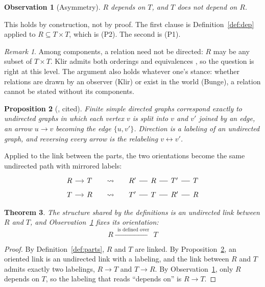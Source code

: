 \documentclass[10pt]{article}
\newtheorem{theorem}{Theorem}
\newtheorem{proposition}[theorem]{Proposition}
\newtheorem{observation}[theorem]{Observation}
\theoremstyle{definition}
\theoremstyle{remark}
\newtheorem*{remark}{Remark}
\begin{document}
\begin{observation}[Asymmetry]\label{lem:asym}
$R$ depends on $T$, and $T$ does not depend on $R$.
\end{observation}
This holds by construction, not by proof. The first clause is Definition~\ref{def:dep} applied to $R \subseteq T \times T$, which is (P2). The second is (P1).

\begin{remark}
Among components, a relation need not be directed: $R$ may be any subset of $T \times T$. Klir admits both orderings and equivalences \cite[p.~5]{klir}, so the question is right at this level. The argument also holds whatever one's stance: whether relations are drawn by an observer (Klir) or exist in the world (Bunge), a relation cannot be stated without its components.
\end{remark}

\begin{proposition}[{\cite[Thm.~4]{pg}}, cited]\label{prop:pg}
Finite simple directed graphs correspond exactly to undirected graphs in which each vertex $v$ is split into $v$ and $v'$ joined by an edge, an arrow $u \to v$ becoming the edge $\{u, v'\}$. Direction is a labeling of an undirected graph, and reversing every arrow is the relabeling $v \leftrightarrow v'$.
\end{proposition}

Applied to the link between the parts, the two orientations become the same undirected path with mirrored labels:
\[
\begin{tikzcd}[column sep=small, row sep=tiny]
  R \arrow[r] & T & \rightsquigarrow & R' \arrow[r, dash] & R \arrow[r, dash] & T' \arrow[r, dash] & T \\
  T \arrow[r] & R & \rightsquigarrow & T' \arrow[r, dash] & T \arrow[r, dash] & R' \arrow[r, dash] & R
\end{tikzcd}
\]

\begin{theorem}\label{thm:main}
The structure shared by the definitions is an undirected link between $R$ and $T$, and Observation~\ref{lem:asym} fixes its orientation:
\[
  R \xrightarrow{\ \ \text{is defined over}\ \ } T
\]
\end{theorem}
\begin{proof}
By Definition~\ref{def:parts}, $R$ and $T$ are linked. By Proposition~\ref{prop:pg}, an oriented link is an undirected link with a labeling, and the link between $R$ and $T$ admits exactly two labelings, $R \to T$ and $T \to R$. By Observation~\ref{lem:asym}, only $R$ depends on $T$, so the labeling that reads ``depends on'' is $R \to T$.
\end{proof}
\end{document}
